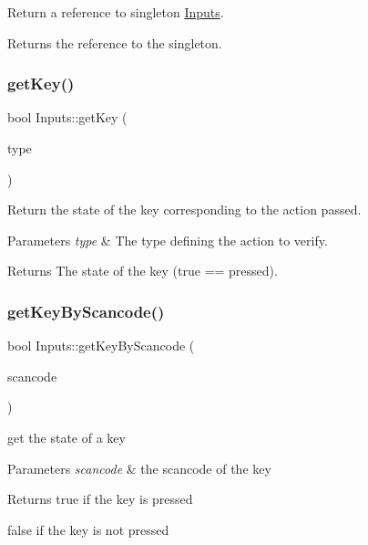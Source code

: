 Return a reference to singleton \hyperlink{class_inputs}{Inputs}.

\begin{DoxyReturn}{Returns}
the reference to the singleton. 
\end{DoxyReturn}
\mbox{\label{class_inputs_a775b7e5d409834058a8bc067b6f77998}} 
\subsubsection{\texorpdfstring{get\+Key()}{getKey()}}
{\footnotesize\ttfamily bool Inputs\+::get\+Key (\begin{DoxyParamCaption}\item[{Input\+Type\+::\+Enum}]{type }\end{DoxyParamCaption})\hspace{0.3cm}{\ttfamily [static]}}

Return the state of the key corresponding to the action passed.


\begin{DoxyParams}{Parameters}
{\em type} & The type defining the action to verify. \\
\hline
\end{DoxyParams}
\begin{DoxyReturn}{Returns}
The state of the key (true == pressed). 
\end{DoxyReturn}
\mbox{\label{class_inputs_ab457f91d9083bfa07bdf3f37d950df60}} 
\subsubsection{\texorpdfstring{get\+Key\+By\+Scancode()}{getKeyByScancode()}}
{\footnotesize\ttfamily bool Inputs\+::get\+Key\+By\+Scancode (\begin{DoxyParamCaption}\item[{S\+D\+L\+\_\+\+Scancode}]{scancode }\end{DoxyParamCaption})\hspace{0.3cm}{\ttfamily [static]}}



get the state of a key 


\begin{DoxyParams}{Parameters}
{\em scancode} & the scancode of the key \\
\hline
\end{DoxyParams}
\begin{DoxyReturn}{Returns}
true if the key is pressed 

false if the key is not pressed 
\end{DoxyReturn}
\mbox{\label{class_inputs_a034e4698e4c0745be637e53c18677fdb}} 
